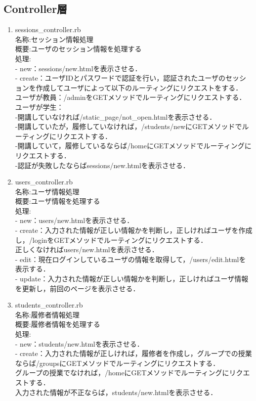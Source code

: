 \newpage

\subsection{Controller層}

\begin{enumerate}

\item  sessions\_controller.rb\\
名称:セッション情報処理  \\
概要:ユーザのセッション情報を処理する \\
処理: \\
- new：sessions/new.htmlを表示させる． \\
- create：ユーザIDとパスワードで認証を行い，認証されたユーザのセッションを作成してユーザによって以下のルーティングにリクエストをする．\\
  ユーザが教員：/adminをGETメソッドでルーティングにリクエストする．\\
  ユーザが学生：\\
  -開講していなければ/static\_page/not\_open.htmlを表示させる．\\
  -開講していたが，履修していなければ，/students/newにGETメソッドでルーティングにリクエストする．\\
  -開講していて，履修しているならば/homeにGETメソッドでルーティングにリクエストする．\\
  -認証が失敗したならばsessions/new.htmlを表示させる．

\item  users\_controller.rb\\
名称:ユーザ情報処理\\
概要:ユーザ情報を処理する\\
処理:\\
- new：users/new.htmlを表示させる．\\
- create：入力された情報が正しい情報かを判断し，正しければユーザを作成し，/loginをGETメソッドでルーティングにリクエストする．\\
          正しくなければusers/new.htmlを表示させる．\\
- edit：現在ログインしているユーザの情報を取得して，/users/edit.htmlを表示する． \\
- update：入力された情報が正しい情報かを判断し，正しければユーザ情報を更新し，前回のページを表示させる．

  \item  students\_controller.rb\\
名称:履修者情報処理\\
概要:履修者情報を処理する\\
処理:\\
- new：students/new.htmlを表示させる．\\
- create：入力された情報が正しければ，履修者を作成し，グループでの授業ならば/groupsにGETメソッドでルーティングにリクエストする．\\
          グループの授業でなければ，/homeにGETメソッドでルーティングにリクエストする．\\
          入力された情報が不正ならば，students/new.htmlを表示させる．


\end{enumerate}
